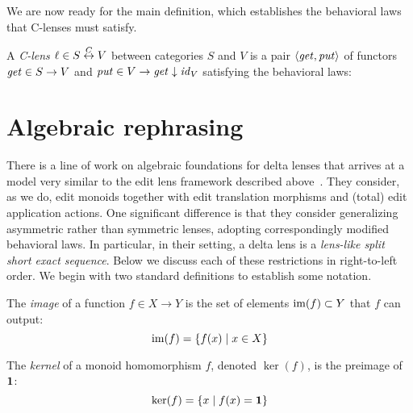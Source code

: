 We are now ready for the main definition, which establishes the behavioral
laws that C-lenses must satisfy.

\begin{definition}
    A \emph{C-lens} $\ell \in S \overset{C}{\leftrightarrow} V$ between categories $S$ and $V$ is
    a pair $\left<\mathit{get},\mathit{put}\right>$ of functors $\mathit{get} \in S \to V$ and
    $\mathit{put} \in V \to \mathit{get}\downarrow\mathit{id}_V$ satisfying the behavioral laws:
\end{definition}

\section{Algebraic rephrasing}
\label{sec:algebraic}
There is a line of work on algebraic foundations for delta lenses that
arrives at a model very similar to the edit lens framework described
above~\cite{stevens2008tat}. They consider, as we do, edit monoids together
with edit translation morphisms and (total) edit application actions.
One significant difference is that they consider generalizing asymmetric
rather than symmetric lenses, adopting correspondingly modified behavioral
laws. In particular, in their setting, a delta lens is a \emph{lens-like
split short exact sequence}. Below we discuss each of these restrictions in
right-to-left order. We begin with two standard definitions to establish
some notation.

\begin{definition}
    The \emph{image} of a function $f \in X \to Y$ is the set of elements
    $\mathrm{im}(f) \subset Y$ that $f$ can output:
    \[\mathrm{im}(f) = \{f(x) \mid x \in X\}\]
\end{definition}

\begin{definition}
    The \emph{kernel} of a monoid homomorphism $f$, denoted $\ker(f)$, is
    the preimage of $\mbox{\bf{1}}$:
    \[\ker(f) = \{x \mid f(x) = \mbox{\bf{1}}\}\]
\end{definition}

